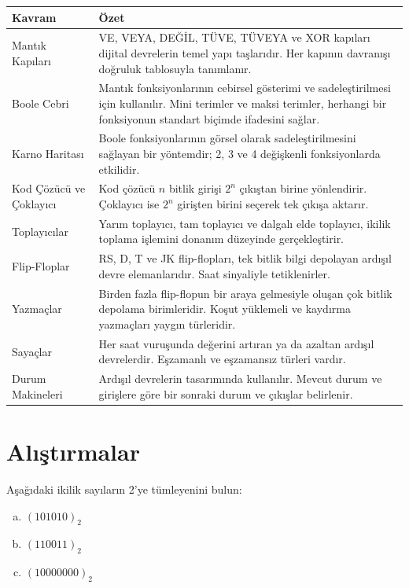 \begin{center}
\small
\begin{tabular}{lp{10cm}}
\toprule
\textbf{Kavram} & \textbf{Özet} \\
\midrule
Mantık Kapıları & VE, VEYA, DEĞİL, TÜVE, TÜVEYA ve XOR kapıları dijital devrelerin temel yapı taşlarıdır. Her kapının davranışı doğruluk tablosuyla tanımlanır. \\
Boole Cebri & Mantık fonksiyonlarının cebirsel gösterimi ve sadeleştirilmesi için kullanılır. Mini terimler ve maksi terimler, herhangi bir fonksiyonun standart biçimde ifadesini sağlar. \\
Karno Haritası & Boole fonksiyonlarının görsel olarak sadeleştirilmesini sağlayan bir yöntemdir; 2, 3 ve 4 değişkenli fonksiyonlarda etkilidir. \\
Kod Çözücü ve Çoklayıcı & Kod çözücü $n$ bitlik girişi $2^n$ çıkıştan birine yönlendirir. Çoklayıcı ise $2^n$ girişten birini seçerek tek çıkışa aktarır. \\
Toplayıcılar & Yarım toplayıcı, tam toplayıcı ve dalgalı elde toplayıcı, ikilik toplama işlemini donanım düzeyinde gerçekleştirir. \\
Flip-Floplar & RS, D, T ve JK flip-flopları, tek bitlik bilgi depolayan ardışıl devre elemanlarıdır. Saat sinyaliyle tetiklenirler. \\
Yazmaçlar & Birden fazla flip-flopun bir araya gelmesiyle oluşan çok bitlik depolama birimleridir. Koşut yüklemeli ve kaydırma yazmaçları yaygın türleridir. \\
Sayaçlar & Her saat vuruşunda değerini artıran ya da azaltan ardışıl devrelerdir. Eşzamanlı ve eşzamansız türleri vardır. \\
Durum Makineleri & Ardışıl devrelerin tasarımında kullanılır. Mevcut durum ve girişlere göre bir sonraki durum ve çıkışlar belirlenir. \\
\bottomrule
\end{tabular}
\end{center}


\section*{Alıştırmalar}
\label{sec:ekB-alistirmalar}

\begin{alistirma}[\kolay]
Aşağıdaki ikilik sayıların 2'ye tümleyenini bulun:
\begin{enumerate}[(a)]
    \item $(101010)_2$
    \item $(110011)_2$
    \item $(10000000)_2$
\end{enumerate}
\end{alistirma}

